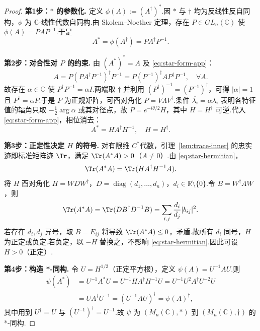 \documentclass[math-font=lm, text-font=lm, math-style=TeX]{sjtureport}
\theoremstyle{plain}
\newtheorem*{proof}{证明}
\theoremstyle{plain}
\begin{document}
\begin{proof}
\textbf{第1步：$*$ 的参数化.} 定义 $\phi(A) := (A^\dagger)^*$.因 $*$ 与 $\dagger$ 均为反线性反自同构，$\phi$ 为 $\mathbb{C}$-线性代数自同构.由 Skolem--Noether 定理，存在 $P \in GL_n(\mathbb{C})$ 使 $\phi(A) = P A P^{-1}$.于是
\begin{equation}\label{eq:star-form-app}
    A^* = \phi(A^\dagger) = P A^\dagger P^{-1}.
\end{equation}

\textbf{第2步：对合性对 $P$ 的约束.} 由 $(A^*)^* = A$ 及 \eqref{eq:star-form-app}：
\begin{equation*}
    A = P (P A^\dagger P^{-1})^\dagger P^{-1} = P (P^{-1})^\dagger A P^\dagger P^{-1}, \quad \forall A.
\end{equation*}
故存在 $\alpha \in \mathbb{C}$ 使 $P^\dagger P^{-1} = \alpha I$.两端取 $\dagger$ 并利用 $(P^\dagger)^{-1} = (P^{-1})^\dagger$，可得 $|\alpha| = 1$ 且 $P^\dagger = \alpha P$.于是 $P$ 为正规矩阵，可酉对角化 $P = V \Lambda V^\dagger$.条件 $\overline{\lambda_i} = \alpha \lambda_i$ 表明各特征值的辐角只取 $-\frac{1}{2}\arg\alpha$ 或其对径点，故 $P = e^{-i\theta/2} H$，其中 $H = H^\dagger$ 可逆.代入 \eqref{eq:star-form-app}，相位消去：
\begin{equation}\label{eq:star-hermitian}
    A^* = H A^\dagger H^{-1}, \quad H = H^\dagger.
\end{equation}

\textbf{第3步：正定性决定 $H$ 的符号.} 对有限维 $C^*$代数，引理~\ref{lem:trace-inner} 的忠实迹即标准矩阵迹 $\Tr$，满足 $\Tr(A^*A) > 0$（$A \neq 0$）.由 \eqref{eq:star-hermitian}，
\begin{equation*}
    \Tr(A^*A) = \Tr(H A^\dagger H^{-1} A).
\end{equation*}
将 $H$ 酉对角化 $H = W D W^\dagger$，$D = \operatorname{diag}(d_1,\dots,d_n)$，$d_i \in \mathbb{R}\setminus\{0\}$.令 $B = W^\dagger A W$，则
\begin{equation*}
    \Tr(A^*A) = \Tr(D B^\dagger D^{-1} B) = \sum_{i,j} \frac{d_i}{d_j} |b_{ij}|^2.
\end{equation*}
若存在 $d_i, d_j$ 异号，取 $B = E_{ij}$ 将导致 $\Tr(A^*A) \le 0$，矛盾.故所有 $d_i$ 同号，$H$ 为正定或负定.若负定，以 $-H$ 替换之，不影响 \eqref{eq:star-hermitian}.因此可设 $H > 0$（正定）.

\textbf{第4步：构造 *-同构.} 令 $U = H^{1/2}$（正定平方根），定义 $\psi(A) = U^{-1} A U$.则
\begin{align*}
    \psi(A^*) &= U^{-1} A^* U = U^{-1} H A^\dagger H^{-1} U = U^{-1} U^2 A^\dagger U^{-2} U \\
             &= U A^\dagger U^{-1} = (U^{-1} A U)^\dagger = \psi(A)^\dagger,
\end{align*}
其中用到 $U^\dagger = U$ 与 $(U^{-1})^\dagger = U^{-1}$.故 $\psi$ 为 $(M_n(\mathbb{C}), *)$ 到 $(M_n(\mathbb{C}), \dagger)$ 的 *-同构.
\end{proof}
\end{document}
